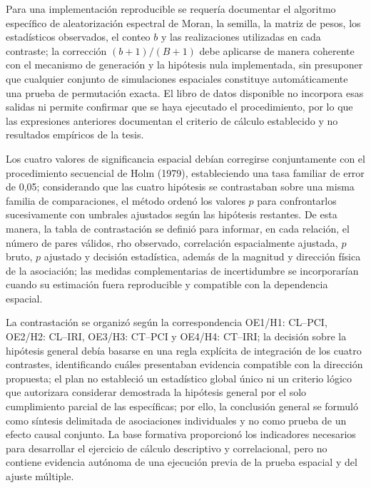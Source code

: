 Para una implementación reproducible se requería documentar el algoritmo específico de aleatorización espectral de Moran, la semilla, la matriz de pesos, los estadísticos observados, el conteo \(b\) y las realizaciones utilizadas en cada contraste; la corrección \((b+1)/(B+1)\) debe aplicarse de manera coherente con el mecanismo de generación y la hipótesis nula implementada, sin presuponer que cualquier conjunto de simulaciones espaciales constituye automáticamente una prueba de permutación exacta. El libro de datos disponible no incorpora esas salidas ni permite confirmar que se haya ejecutado el procedimiento, por lo que las expresiones anteriores documentan el criterio de cálculo establecido y no resultados empíricos de la tesis.

Los cuatro valores de significancia espacial debían corregirse conjuntamente con el procedimiento secuencial de Holm (1979), estableciendo una tasa familiar de error de 0,05; considerando que las cuatro hipótesis se contrastaban sobre una misma familia de comparaciones, el método ordenó los valores \(p\) para confrontarlos sucesivamente con umbrales ajustados según las hipótesis restantes. De esta manera, la tabla de contrastación se definió para informar, en cada relación, el número de pares válidos, rho observado, correlación espacialmente ajustada, \(p\) bruto, \(p\) ajustado y decisión estadística, además de la magnitud y dirección física de la asociación; las medidas complementarias de incertidumbre se incorporarían cuando su estimación fuera reproducible y compatible con la dependencia espacial.

La contrastación se organizó según la correspondencia OE1/H1: CL–PCI, OE2/H2: CL–IRI, OE3/H3: CT–PCI y OE4/H4: CT–IRI; la decisión sobre la hipótesis general debía basarse en una regla explícita de integración de los cuatro contrastes, identificando cuáles presentaban evidencia compatible con la dirección propuesta; el plan no estableció un estadístico global único ni un criterio lógico que autorizara considerar demostrada la hipótesis general por el solo cumplimiento parcial de las específicas; por ello, la conclusión general se formuló como síntesis delimitada de asociaciones individuales y no como prueba de un efecto causal conjunto. La base formativa proporcionó los indicadores necesarios para desarrollar el ejercicio de cálculo descriptivo y correlacional, pero no contiene evidencia autónoma de una ejecución previa de la prueba espacial y del ajuste múltiple.


